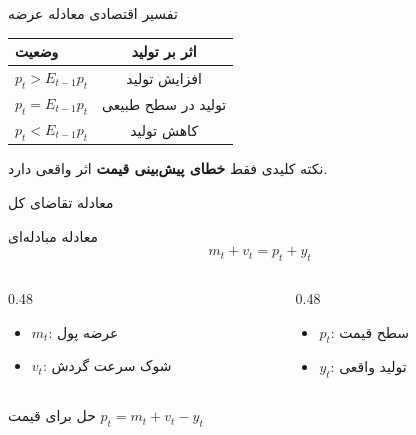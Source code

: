\documentclass[aspectratio=169,11pt]{beamer}
\newcommand{\important}[1]{\textcolor{AlertRed}{\textbf{#1}}}
\begin{document}
\begin{frame}{تفسیر اقتصادی معادله عرضه}
  \begin{center}
    \renewcommand{\arraystretch}{1.5}
    \begin{tabular}{lc}
      \toprule
      \textbf{وضعیت}     & \textbf{اثر بر تولید} \\
      \midrule
      $p_t > E_{t-1}p_t$ & \textcolor{SuccessGreen}{افزایش تولید} \\
      $p_t = E_{t-1}p_t$ & تولید در سطح طبیعی \\
      $p_t < E_{t-1}p_t$ & \textcolor{AlertRed}{کاهش تولید} \\
      \bottomrule
    \end{tabular}
  \end{center}
  \vspace{0.5cm}
  \begin{alertblock}{نکته کلیدی}
    فقط \important{خطای پیش‌بینی قیمت} اثر واقعی دارد.
  \end{alertblock}
\end{frame}

\begin{frame}{معادله تقاضای کل}
  \begin{block}{معادله مبادله‌ای}
    \centering
    \large
    \[
      m_t + v_t = p_t + y_t
    \]
  \end{block}
  \vspace{0.3cm}
  \begin{LTR}
  \begin{columns}[T]
    \begin{column}{0.48\textwidth}
      \begin{RTL}
      \begin{itemize}
        \item $m_t$: عرضه پول
        \item $v_t$: شوک سرعت گردش
      \end{itemize}
      \end{RTL}
    \end{column}
    \hfill
    \begin{column}{0.48\textwidth}
      \begin{RTL}
      \begin{itemize}
        \item $p_t$: سطح قیمت
        \item $y_t$: تولید واقعی
      \end{itemize}
      \end{RTL}
    \end{column}
  \end{columns}
  \end{LTR}
  \vspace{0.3cm}
  \begin{exampleblock}{حل برای قیمت}
    \centering
    $p_t = m_t + v_t - y_t$
  \end{exampleblock}
\end{frame}
\end{document}
